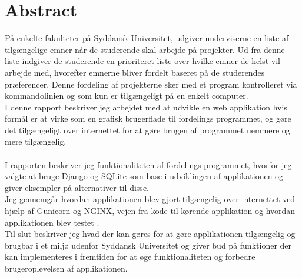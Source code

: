 \section{Abstract}
På enkelte fakulteter på Syddansk Universitet, udgiver underviserne en liste af tilgængelige emner når de studerende skal arbejde på projekter. Ud fra denne liste indgiver de studerende en prioriteret liste over hvilke emner de helst vil arbejde med, hvorefter emnerne bliver fordelt baseret på de studerendes præferencer. Denne fordeling af projekterne sker med et program kontrolleret via kommandolinien og som kun er tilgængeligt på en enkelt computer.\\
I denne rapport beskriver jeg arbejdet med at udvikle en web applikation hvis formål er at virke som en grafisk brugerflade til fordelings programmet, og gøre det tilgængeligt over internettet for at gøre brugen af programmet nemmere og mere tilgængelig.\\\\
I rapporten beskriver jeg funktionaliteten af fordelings programmet, hvorfor jeg valgte at bruge Django og SQLite som base i udviklingen af applikationen og giver eksempler på alternativer til disse.\\
Jeg gennemgår hvordan applikationen blev gjort tilgængelig over internettet ved hjælp af Gunicorn og NGINX, vejen fra kode til kørende applikation og hvordan applikationen blev testet .\\
Til slut beskriver jeg hvad der kan gøres for at gøre applikationen tilgængelig og brugbar i et miljø udenfor Syddansk Universitet og giver bud på funktioner der kan implementeres i fremtiden for at øge funktionaliteten og forbedre brugeroplevelsen af applikationen.